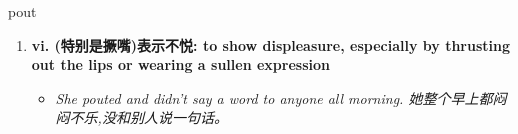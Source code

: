 
\begin{frame}
{\huge pout}
\begin{center}
\begin{enumerate}\Large
  \item \textbf{vi. (特别是撅嘴)表示不悦: to show displeasure, especially by thrusting out the lips or wearing a sullen expression}
  \begin{itemize}
    \item \em{\Large{She pouted and didn't say a word to anyone all morning. 她整个早上都闷闷不乐,没和别人说一句话。}}
  \end{itemize}
\end{enumerate}
\end{center}
\end{frame}
